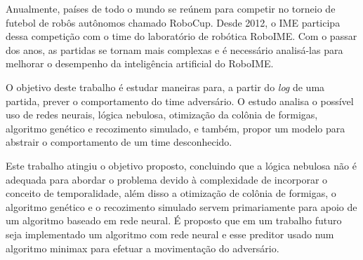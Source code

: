 \documentclass[
	12pt,				%
	oneside,			%
	a4paper,			%
	english,			%
	brazil,				%
	]{ime-abntex2}
\begin{document}

\setlength{\absparsep}{18pt} %
\begin{resumo}


Anualmente, países de todo o mundo se reúnem para competir no torneio de
futebol de robôs autônomos chamado RoboCup. Desde 2012, o IME participa dessa
competição com o time do laboratório de robótica RoboIME. Com o passar dos
anos, as partidas se tornam mais complexas e é necessário analisá-las para
melhorar o desempenho da inteligência artificial do RoboIME.

O objetivo deste trabalho é estudar maneiras para, a partir do \textit{log}
de uma partida, prever o comportamento do time adversário. O estudo analisa o
possível uso de redes neurais, lógica nebulosa, otimização da colônia de
formigas, algoritmo genético e recozimento simulado, e também, propor um modelo
para abstrair o comportamento de um time desconhecido.

Este trabalho atingiu o objetivo proposto, concluindo que a lógica nebulosa não
é adequada para abordar o problema devido à complexidade de incorporar o
conceito de temporalidade, além disso a otimização de colônia de formigas, o
algoritmo genético e o recozimento simulado servem primariamente para apoio de
um algoritmo baseado em rede neural. É proposto que em um trabalho futuro seja
implementado um algoritmo com rede neural e esse preditor usado num algoritmo
minimax para efetuar a movimentação do adversário.



\end{resumo}
\end{document}
